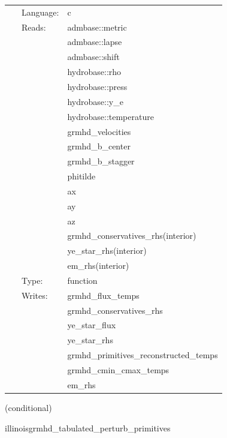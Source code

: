  \begin{tabular*}{160mm}{cll} 
~ & Language:  & c \\ 
~ & Reads:  & admbase::metric \\ 
~& ~ &admbase::lapse\\ 
~& ~ &admbase::shift\\ 
~& ~ &hydrobase::rho\\ 
~& ~ &hydrobase::press\\ 
~& ~ &hydrobase::y\_e\\ 
~& ~ &hydrobase::temperature\\ 
~& ~ &grmhd\_velocities\\ 
~& ~ &grmhd\_b\_center\\ 
~& ~ &grmhd\_b\_stagger\\ 
~& ~ &phitilde\\ 
~& ~ &ax\\ 
~& ~ &ay\\ 
~& ~ &az\\ 
~& ~ &grmhd\_conservatives\_rhs(interior)\\ 
~& ~ &ye\_star\_rhs(interior)\\ 
~& ~ &em\_rhs(interior)\\ 
~ & Type:  & function \\ 
~ & Writes:  & grmhd\_flux\_temps \\ 
~& ~ &grmhd\_conservatives\_rhs\\ 
~& ~ &ye\_star\_flux\\ 
~& ~ &ye\_star\_rhs\\ 
~& ~ &grmhd\_primitives\_reconstructed\_temps\\ 
~& ~ &grmhd\_cmin\_cmax\_temps\\ 
~& ~ &em\_rhs\\ 
\end{tabular*} 


\vspace{5mm}

   (conditional) 

\hspace{5mm} illinoisgrmhd\_tabulated\_perturb\_primitives 

\hspace{5mm}{\it tabulated version of illinoisgrmhd\_perturb\_primitives } 


\hspace{5mm}

